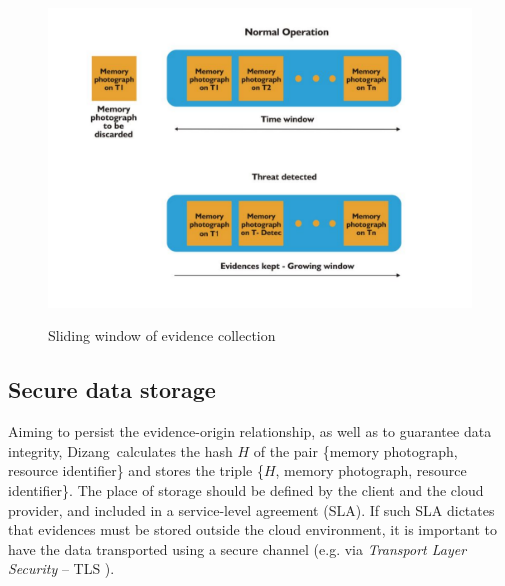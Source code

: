\documentclass[conference]{IEEEtran}
\newcommand{\marcos}[1]{{\color{green}{MARCOS: #1}}}
\newcommand{\fancyname}{Dizang}
\begin{document}
\begin{figure}[tb!]
\footnotesize
\caption{Sliding window of evidence collection \marcos{Essa imagem tem MUITO espaço em branco nos arredores: fica esquisito no slide... Melhor cortar esse monte de branco - Hamilton: Done}}
\includegraphics[center,scale=0.35]{janela_ieee-eng.pdf}
\centering
\label{fig:janela}
\end{figure}



\subsection{Secure data storage}
\label{sec:proposal-desc-memcpy}


%
Aiming to persist the evidence-origin relationship, as well as to guarantee data integrity, \fancyname\ calculates the hash $H$ of the pair \{memory photograph, resource identifier\} and stores the triple \{$H$, memory photograph, resource identifier\}.
%
The place of storage should be defined by the client and the cloud provider, and included in a service-level agreement (SLA).
%
If such SLA dictates that evidences must be stored outside the cloud environment, it is important to have the data transported using a secure channel (e.g. via \textit{Transport Layer Security} – TLS \cite{DierksT2008}).

\end{document}
